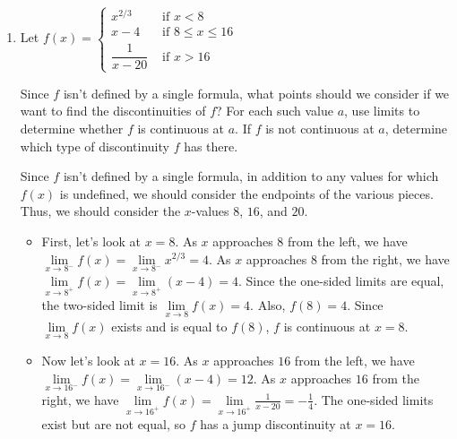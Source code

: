 \documentclass[main]{subfiles}
\begin{document}
\begin{enumerate}[resume]
\begin{solution}
    Since both one-sided limits exist but $\lim\limits_{x \to 0} f(x)$ does not exist,
    $x=0$ is a jump discontinuity.
    
  \end{solution}

\item 
  \begin{problem}[\vfill]
    Let $f(x) =
    \begin{cases}
      x^{2/3} & \text{ if } x < 8 \\
      x - 4 & \text{ if } 8 \leq x \leq 16 \\
      \dfrac{1}{x - 20} & \text{ if } x > 16
    \end{cases}$

    Since $f$ isn't defined by a single formula, what points should we consider if we want to find the discontinuities of $f$? For each such value $a$, use limits to determine whether $f$ is continuous at $a$. If $f$ is not continuous at $a$, determine which type of discontinuity $f$ has there.
  \end{problem}

  \begin{solution}
    Since $f$ isn't defined by a single formula, in addition to any values for which $f(x)$ 
    is undefined, we should consider the endpoints of the various pieces. Thus, we
    should consider the $x$-values $8$, $16$, and $20$. 

    \begin{itemize}

    \item
    First, let's look at $x=8$. As $x$ approaches $8$ from the left, we have
    $\lim\limits_{x \to 8^-} f(x) = \lim\limits_{x \to 8^-} x^{2/3} = 4$. 
    As $x$ approaches $8$ from the right,
    we have $\lim\limits_{x \to 8^+} f(x) =\lim\limits_{x \to 8^+} (x-4) = 4$.
    Since the one-sided limits are equal, the two-sided limit is 
    $\lim\limits_{x \to 8} f(x) =4$. Also, $f(8) = 4$. Since 
    $\lim\limits_{x \to 8} f(x)$ exists and is equal to $f(8)$, $f$ is continuous
    at $x=8$. 
    
    \item
    Now let's look at $x=16$. As $x$ approaches $16$ from the left, we have
    $\lim\limits_{x \to 16^-} f(x) = \lim\limits_{x \to 16^-} (x-4) = 12$. 
    As $x$ approaches $16$ from the right,
    we have $\lim\limits_{x \to 16^+} f(x) =\lim\limits_{x \to 16^+} \frac{1}{x-20}=
    -\frac{1}{4}$. The one-sided limits exist but are not equal, so $f$ has a jump
    discontinuity at $x=16$.


\end{itemize}
\end{solution}
\end{enumerate}
\end{document}
